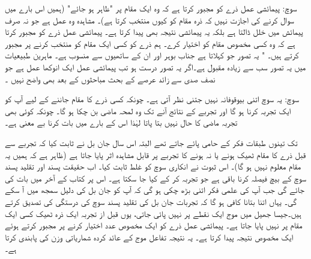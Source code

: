 \quad {}
 سوچ:  پیمائشی عمل ذرے کو مجبور کرتا ہے کہ وہ ایک مقام پر "ظاہر  ہو جائے" (ہمیں اس بارے میں سوال کرنے کی اجازت نہیں     کہ ذرہ  مقام  کو کیوں منتخب کرتا ہے)۔  مشاہدہ وہ عمل ہے جو نہ صرف پیمائش میں خلل  ڈالتا ہے بلکہ   یہ پیمائشی نتیجہ بھی پیدا کرتا ہے۔ پیمائشی عمل ذرے کو مجبور کرتا ہے کہ وہ کسی مخصوص مقام کو اختیار کرے۔ ہم ذرے کو کسی ایک مقام کو منتخب کرنے پر مجبور کرتے ہیں۔  " یہ تصور جو  کہلاتا ہے  جناب بوہر اور ان کے ساتھیوں سے منسوب   ہے۔ ماہرین  طبیعیات میں یہ تصور سب سے زیادہ مقبول ہے۔اگر یہ  تصور  درست ہو تب پیمائشی عمل ایک انوکھا عمل ہے جو نصف صدی سے زائد عرصے  کے بحث   مباحثوں کے بعد  بھی واضح نہیں ۔

\quad {}
 سوچ:  یہ سوچ اتنی بیوقوفانہ نہیں  جتنی نظر آتی ہے۔ چونکہ کسی ذرے کا مقام جاننے کے لیے آپ کو ایک تجربہ کرنا ہو گا اور تجربے کے نتائج آنے تک وہ لمحہ  ماضی  بن چکا ہو گا۔ چونکہ کوئی بھی تجربہ ماضی کا حال نہیں  بتا پاتا لہٰذا اس کے بارے میں بات کرنا بے معنی ہے۔  

      تک تینوں طبقات   فکر    کے حامی پائے جاتے تھے البتہ اس سال   جان بل نے  ثابت کیا کہ تجربے سے قبل   ذرے  کا مقام ٹھیک  ہونے یا   نہ  ہونے کا  تجربے  پر قابل مشاہدہ اثر پایا جاتا ہے (ظاہر ہے کہ ہمیں یہ مقام معلوم نہیں ہو گا)۔ اس ثبوت نے انکاری سوچ کو غلط ثابت کیا۔ اب حقیقت پسند اور تقلید پسند سوچ کے بیچ   فیصلہ کرنا باقی ہے جو تجربہ کر کے کیا جا سکتا ہے۔ اس پر کتاب کے آخر میں بات کی جائے گی جب آپ کی علمی فکر  اتنی بڑھ چکی ہو گی کہ آپ کو   جان بل کی دلیل سمجھ میں  آ سکے گی۔ یہاں اتنا بتانا کافی ہو گا کہ تجربات  جان بل کی تقلید پسند سوچ کی درستگی کی تصدیق کرتے ہیں۔جیسا جھیل میں  موج ایک نقطے  پر نہیں پائی جاتی،  یوں  قبل از تجربہ  ایک ذرہ ٹھیک کسی  ایک مقام پر  نہیں پایا جاتا ہے۔  پیمائشی عمل ذرے کو ایک مخصوص عدد اختیار کرنے پر مجبور کرتے ہوئے  ایک مخصوص نتیجہ پیدا کرتا ہے۔ یہ نتیجہ تفاعل موج کے  عائد  کردہ شماریاتی وزن کی پابندی کرتا ہے۔

